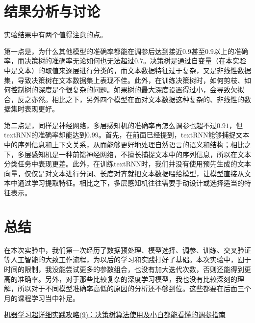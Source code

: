 \documentclass{article}
\begin{document}
\section{结果分析与讨论}
实验结果中有两个值得注意的点。

第一点是，为什么其他模型的准确率都能在调参后达到接近$0.9$甚至$0.9$以上的准确率，而决策树的准确率无论如何也无法超过$0.7$。决策树是通过自变量（在本实验中是文本）的取值来逐层进行分类的，而文本数据特征过于复杂，又是非线性数据集，导致决策树在文本数据集上表现不佳。此外，在训练决策树时，如何剪枝、如何控制树的深度是个很复杂的问题。如果树的最大深度设置得过小，会导致欠拟合，反之亦然。相比之下，另外四个模型在面对文本数据这种复杂的、非线性的数据集时表现更好。

第二点是，同样是神经网络，多层感知机的准确率再怎么调参也超不过$0.91$，但textRNN的准确率却能达到$0.99$。首先，在前面已经提到，textRNN能够捕捉文本中的序列信息和上下文关系，从而能够更好地处理自然语言的语义和结构；相比之下，多层感知机是一种前馈神经网络，不擅长捕捉文本中的序列信息，所以在文本分类任务中表现更差。此外，在训练textRNN时，我们并没有使用预先生成的文本向量，仅仅是对文本进行分词、长度对齐就把文本数据喂给模型，让模型直接从文本中通过学习提取特征。相比之下，多层感知机往往需要手动设计或选择适当的特征表示。


\section{总结}
在本次实验中，我们第一次经历了数据预处理、模型选择、调参、训练、交叉验证等人工智能的大致工作流程，为以后的学习和实践打好了基础。本次实验中，囿于时间的限制，我没能尝试更多的参数组合，也没有加大迭代次数，否则还能得到更高的准确率。另外，对于那些比较复杂的深度学习模型，我也没有比较深刻的理解，所以对于不同模型准确率高低的原因的分析还不够到位。这些都要在后面三个月的课程学习当中补足。


\begin{thebibliography}{99}  

\href{https://zhuanlan.zhihu.com/p/103136609}{机器学习超详细实践攻略(9)：决策树算法使用及小白都能看懂的调参指南}

\end{thebibliography}
\end{document}
